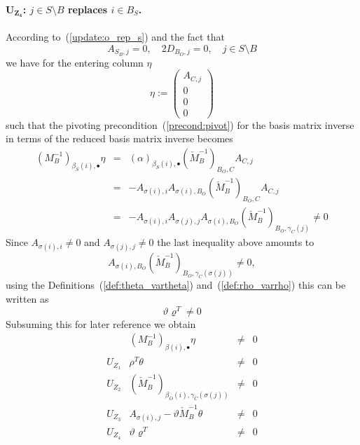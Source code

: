 \documentclass[a4paper]{article}
\begin{document}
\paragraph{$\mathbf{U_{Z_{4}}}$: $j \in S \setminus B$ replaces $i \in B_{S}$.}
According to~(\ref{update:o_rep_s})
and the fact that
\begin{equation}
A_{S_{B},j}=0, \quad 2D_{B_{O}, j}=0, \quad j \in S \setminus B
\end{equation}
we have for the entering column $\eta$
\begin{equation}
\eta:=
\left(
\begin{array}{c}
A_{C, j} \\
\hline
0 \\
\hline
0 \\
\hline
0
\end{array}
\right)
\end{equation}
such that the pivoting precondition~(\ref{precond:pivot})
for the basis matrix inverse in terms of
the reduced basis matrix inverse becomes
\begin{eqnarray}
\left(M_{B}^{-1}\right)_{\beta_{S}(i), \bullet} \eta
&=&
\left(\alpha\right)_{\beta_{S}(i), \bullet}
\left(\check{M}_{B}^{-1}\right)_{B_{O},C}A_{C,j}
\nonumber \\
&=&
-A_{\sigma(i),i}A_{\sigma(i),B_{O}}
 \left(\check{M}_{B}^{-1}\right)_{B_{O},C}A_{C,j}
\nonumber \\
&=&
-A_{\sigma(i),i}A_{\sigma(j),j}A_{\sigma(i),B_{O}}
 \left(\check{M}_{B}^{-1}\right)_{B_{O},\gamma_{C}(j)}
 \neq 0
 \nonumber
\end{eqnarray}
Since $A_{\sigma(i), i} \neq 0$ and $A_{\sigma(j),j} \neq 0$
the last inequality above amounts to
\begin{equation}
A_{\sigma(i),B_{O}}
\left(\check{M}_{B}^{-1}\right)_{B_{O},\gamma_{C}(\sigma(j))}
\neq 0,
\nonumber
\end{equation}
using the Definitions~(\ref{def:theta_vartheta})
and~(\ref{def:rho_varrho}) this can be written as
\begin{equation}
\vartheta \varrho^{T} \neq 0
\end{equation}
Subsuming this for later reference we obtain
\begin{equation}
\label{table:pivot_precond}
\begin{array}{c|ccc}
&
\left(M_{B}^{-1}\right)_{\beta(i), \bullet} \eta
&\neq& 0
 \\
\hline
U_{Z_{1}} 
&
\rho^{T} \theta &\neq& 0
 \\
U_{Z_{2}}
&
\left(\check{M}_{B}^{-1}\right)_{\beta_{O}(i), \gamma_{C}(\sigma(j))}
&\neq& 0
 \\
U_{Z_{3}}
&
A_{\sigma(i), j}
-\vartheta\check{M}_{B}^{-1}\theta
&\neq& 0
 \\
U_{Z_{4}}
&
\vartheta \varrho^{T} &\neq& 0
\end{array}
\end{equation}
\end{document}

